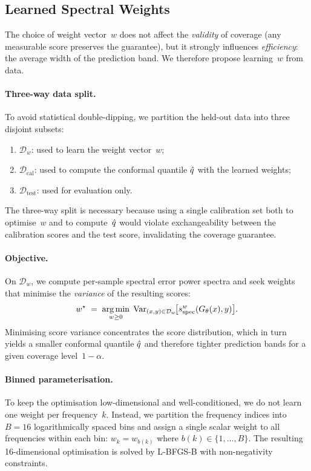 \subsection{Learned Spectral Weights}
\label{sec:method:learned}

The choice of weight vector~$w$ does not affect the \emph{validity} of
coverage (any measurable score preserves the guarantee), but it
strongly influences \emph{efficiency}: the average width of the
prediction band.  We therefore propose learning~$w$ from data.

\paragraph{Three-way data split.}
To avoid statistical double-dipping, we partition the held-out data into
three disjoint subsets:
\begin{enumerate}
  \item $\mathcal{D}_w$: used to learn the weight vector~$w$;
  \item $\mathcal{D}_{\mathrm{cal}}$: used to compute the conformal
    quantile $\hat{q}$ with the learned weights;
  \item $\mathcal{D}_{\mathrm{test}}$: used for evaluation only.
\end{enumerate}
The three-way split is necessary because using a single calibration set both
to optimise~$w$ and to compute~$\hat{q}$ would violate exchangeability
between the calibration scores and the test score, invalidating the
coverage guarantee.

\paragraph{Objective.}
On $\mathcal{D}_w$, we compute per-sample spectral error power spectra
and seek weights that minimise the \emph{variance} of the resulting scores:
\begin{equation}
  \label{eq:weight-obj}
  w^{\star}
  \;=\;
  \operatorname*{arg\,min}_{w \geq 0}
  \;\operatorname{Var}_{(x,y) \in \mathcal{D}_w}\!\bigl[s_{\mathrm{spec}}^{w}(G_\theta(x), y)\bigr].
\end{equation}
Minimising score variance concentrates the score distribution, which in turn
yields a smaller conformal quantile $\hat{q}$ and therefore tighter prediction
bands for a given coverage level~$1-\alpha$.

\paragraph{Binned parameterisation.}
To keep the optimisation low-dimensional and well-conditioned, we do not
learn one weight per frequency~$k$.  Instead, we partition the frequency
indices into $B = 16$ logarithmically spaced bins and assign a single
scalar weight to all frequencies within each bin:
$w_k = w_{b(k)}$ where $b(k) \in \{1, \dots, B\}$.
The resulting 16-dimensional optimisation is solved by L-BFGS-B with
non-negativity constraints.

